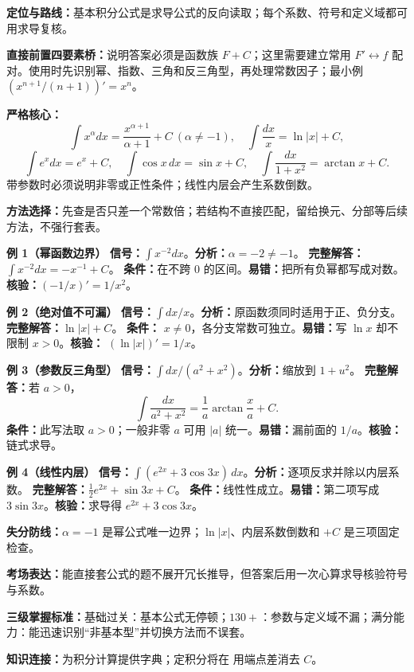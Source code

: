 
\par

\begin{knowledgeBox}
\textbf{定位与路线：}基本积分公式是求导公式的反向读取；每个系数、符号和定义域都可用求导复核。

\textbf{直接前置四要素桥：}说明答案必须是函数族 \(F+C\)；这里需要建立常用 \(F'\leftrightarrow f\) 配对。使用时先识别幂、指数、三角和反三角型，再处理常数因子；最小例 \((x^{n+1}/(n+1))'=x^n\)。

\textbf{严格核心：}
\[
\int x^\alpha dx=\frac{x^{\alpha+1}}{\alpha+1}+C\ (\alpha\ne-1),\quad
\int\frac{dx}{x}=\ln|x|+C,
\]
\[
\int e^x dx=e^x+C,\quad
\int\cos x\,dx=\sin x+C,\quad
\int\frac{dx}{1+x^2}=\arctan x+C.
\]
带参数时必须说明非零或正性条件；线性内层会产生系数倒数。

\textbf{方法选择：}先查是否只差一个常数倍；若结构不直接匹配，留给换元、分部等后续方法，不强行套表。

\textbf{例 1（幂函数边界）}\quad
\textbf{信号：}\(\int x^{-2}dx\)。\textbf{分析：}\(\alpha=-2\ne-1\)。
\textbf{完整解答：}\(\int x^{-2}dx=-x^{-1}+C\)。
\textbf{条件：}在不跨 \(0\) 的区间。\textbf{易错：}把所有负幂都写成对数。\textbf{核验：}\((-1/x)'=1/x^2\)。

\textbf{例 2（绝对值不可漏）}\quad
\textbf{信号：}\(\int dx/x\)。\textbf{分析：}原函数须同时适用于正、负分支。
\textbf{完整解答：}\(\ln|x|+C\)。
\textbf{条件：} \(x\ne0\)，各分支常数可独立。\textbf{易错：}写 \(\ln x\) 却不限制 \(x>0\)。\textbf{核验：} \((\ln|x|)'=1/x\)。

\textbf{例 3（参数反三角型）}\quad
\textbf{信号：}\(\int dx/(a^2+x^2)\)。\textbf{分析：}缩放到 \(1+u^2\)。
\textbf{完整解答：}若 \(a>0\)，
\[
\int\frac{dx}{a^2+x^2}=\frac1a\arctan\frac xa+C.
\]
\textbf{条件：}此写法取 \(a>0\)；一般非零 \(a\) 可用 \(|a|\) 统一。\textbf{易错：}漏前面的 \(1/a\)。\textbf{核验：}链式求导。

\textbf{例 4（线性内层）}\quad
\textbf{信号：}\(\int(e^{2x}+3\cos3x)\,dx\)。\textbf{分析：}逐项反求并除以内层系数。
\textbf{完整解答：}\(\frac12e^{2x}+\sin3x+C\)。
\textbf{条件：}线性性成立。\textbf{易错：}第二项写成 \(3\sin3x\)。\textbf{核验：}求导得 \(e^{2x}+3\cos3x\)。

\textbf{失分防线：}\(\alpha=-1\) 是幂公式唯一边界；\(\ln|x|\)、内层系数倒数和 \(+C\) 是三项固定检查。

\textbf{考场表达：}能直接套公式的题不展开冗长推导，但答案后用一次心算求导核验符号与系数。

\textbf{三级掌握标准：}基础过关：基本公式无停顿；\(130+\)：参数与定义域不漏；满分能力：能迅速识别“非基本型”并切换方法而不误套。

\textbf{知识连接：}为积分计算提供字典；定积分将在 用端点差消去 \(C\)。
\end{knowledgeBox}

